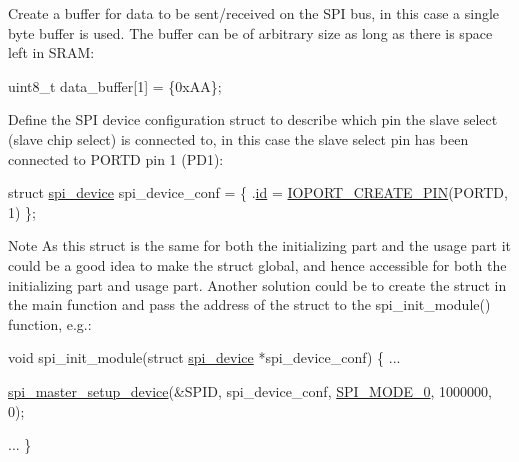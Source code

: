 \begin{DoxyEnumerate}
\item Create a buffer for data to be sent/received on the S\-P\-I bus, in this case a single byte buffer is used. The buffer can be of arbitrary size as long as there is space left in S\-R\-A\-M\-:
\begin{DoxyItemize}
\item 
\begin{DoxyCode}
        uint8\_t data\_buffer[1] = \{0xAA\};
\end{DoxyCode}

\end{DoxyItemize}
\item Define the S\-P\-I device configuration struct to describe which pin the slave select (slave chip select) is connected to, in this case the slave select pin has been connected to P\-O\-R\-T\-D pin 1 (P\-D1)\-:
\begin{DoxyItemize}
\item 
\begin{DoxyCode}
        \textcolor{keyword}{struct }\hyperlink{structspi__device}{spi\_device} spi\_device\_conf = \{
            .\hyperlink{structspi__device_a46fd65e51a4d6c4d6056639a4f154186}{id} = \hyperlink{group__ioport__group_gabc09edad7c3187dec63ce47e6f1b3c51}{IOPORT\_CREATE\_PIN}(PORTD, 1)
        \};
\end{DoxyCode}

\item \begin{DoxyNote}{Note}
As this struct is the same for both the initializing part and the usage part it could be a good idea to make the struct global, and hence accessible for both the initializing part and usage part. Another solution could be to create the struct in the main function and pass the address of the struct to the spi\-\_\-init\-\_\-module() function, e.\-g.\-: 
\begin{DoxyCode}
           \textcolor{keywordtype}{void} spi\_init\_module(\textcolor{keyword}{struct} \hyperlink{structspi__device}{spi\_device} *spi\_device\_conf)
           \{
               ...

               \hyperlink{group__xmega__spi__master__group_ga81164f6dd2297a64337f3a052171e0f8}{spi\_master\_setup\_device}(&SPID, 
      spi\_device\_conf, \hyperlink{group__xmega__spi__master__group_ga1ec07ad94d5f6276c1c0b41d0550fe52}{SPI\_MODE\_0}, 1000000, 0);

               ...
           \}
\end{DoxyCode}


\end{DoxyNote}
\end{DoxyItemize}
\end{DoxyEnumerate}
